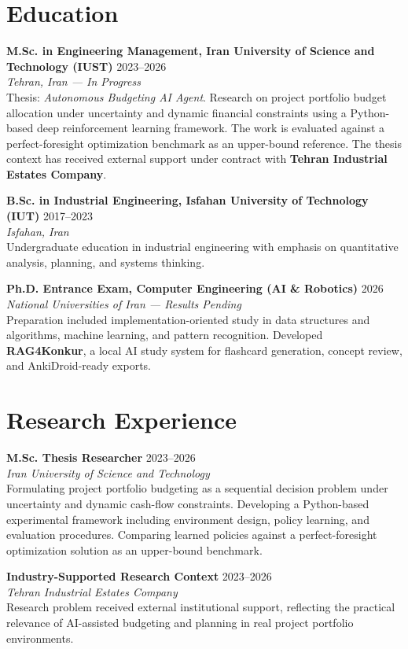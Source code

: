 \documentclass[11pt,a4paper]{article}
\newcommand{\Entry}[4]{
    \textbf{#1} \hfill {\color{gray}#2}\\
    \textit{#3}\\
    #4
    \vspace{0.8em}
}
\begin{document}
\section*{Education}

\Entry
{M.Sc. in Engineering Management, Iran University of Science and Technology (IUST)}
{2023--2026}
{Tehran, Iran --- In Progress}
{
Thesis: \textit{Autonomous Budgeting AI Agent}. Research on project portfolio budget allocation under uncertainty and dynamic financial constraints using a Python-based deep reinforcement learning framework.
The work is evaluated against a perfect-foresight optimization benchmark as an upper-bound reference.
The thesis context has received external support under contract with \textbf{Tehran Industrial Estates Company}.
}

\Entry
{B.Sc. in Industrial Engineering, Isfahan University of Technology (IUT)}
{2017--2023}
{Isfahan, Iran}
{
Undergraduate education in industrial engineering with emphasis on quantitative analysis, planning, and systems thinking.
}

\Entry
{Ph.D. Entrance Exam, Computer Engineering (AI \& Robotics)}
{2026}
{National Universities of Iran --- Results Pending}
{
Preparation included implementation-oriented study in data structures and algorithms, machine learning, and pattern recognition.
Developed \textbf{RAG4Konkur}, a local AI study system for flashcard generation, concept review, and AnkiDroid-ready exports.
}

\section*{Research Experience}

\Entry
{M.Sc. Thesis Researcher}
{2023--2026}
{Iran University of Science and Technology}
{
Formulating project portfolio budgeting as a sequential decision problem under uncertainty and dynamic cash-flow constraints.
Developing a Python-based experimental framework including environment design, policy learning, and evaluation procedures.
Comparing learned policies against a perfect-foresight optimization solution as an upper-bound benchmark.
}

\Entry
{Industry-Supported Research Context}
{2023--2026}
{Tehran Industrial Estates Company}
{
Research problem received external institutional support, reflecting the practical relevance of AI-assisted budgeting and planning in real project portfolio environments.
}
\end{document}
